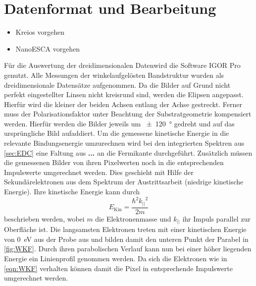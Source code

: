     \section{Datenformat und Bearbeitung}
    \begin{itemize}
        \item Kreios vorgehen
        \item NanoESCA vorgehen
    \end{itemize}
        Für die Auswertung der dreidimensionalen Datenwird die Software IGOR Pro \cite{IGOR} genutzt.
        Alle Messungen der winkelaufgelösten Bandstruktur wurden als dreidimensionale Datensätze aufgenommen.
        Da die Bilder auf Grund nicht perfekt eingestellter Linsen nicht kreisrund sind, werden die Elipsen angepasst.
        Hierfür wird die kleiner der beiden Achsen entlang der Achse gestreckt.
        Ferner muss der Polarisationsfaktor unter Beachtung der Substratgeometrie kompensiert werden.
        Hierfür werden die Bilder jeweils um \SI{\pm120}{\degree} gedreht und auf das ursprüngliche Bild aufaddiert.
        Um die gemessene kinetische Energie in die relevante Bindungsenergie umzurechnen wird bei den integrierten Spektren aus \autoref{sec:EDC} eine Faltung aus \textbf{...} an die Fermikante durchgeführt.
        Zusätzlich müssen die gemessenen Bilder von ihren Pixelwerten noch in die entsprechenden Impulswerte umgerechnet werden.
        Dies geschieht mit Hilfe der Sekundärelektronen aus dem Spektrum der Austrittsarbeit (niedrige kinetische Energie).
        Ihre kinetische Energie kann durch 
        \begin{equation}
            E_\text{Kin} = \frac{\hbar^2 {k_{||}}^2}{2 m}
            \label{eqn:WKF}
        \end{equation}
        beschrieben werden, wobei $m$ die Elektronenmasse und $k_{||}$ ihr Impuls parallel zur Oberfläche ist.
        Die langsamsten Elektronen treten mit einer kinetischen Energie von \SI{0}{\electronvolt} aus der Probe aus und bilden damit den unteren Punkt der Parabel in \autoref{fig:WKF}.
        Durch ihren parabolischen Verlauf kann nun bei einer höher liegenden Energie ein Linienprofil genommen werden.
        Da sich die Elektronen wie in \autoref{eqn:WKF} verhalten können damit die Pixel in entsprechende Impulswerte umgerechnet werden.


